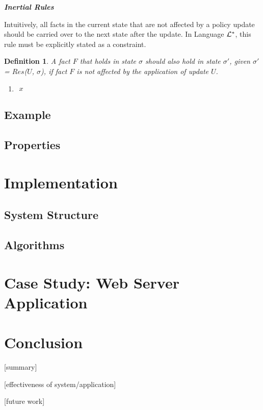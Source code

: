 \documentclass[10pt, twocolumn]{article}
\newtheorem{definition}{Definition}
\begin{document}
        \noindent \textbf{\emph{Inertial Rules}}

          Intuitively, all facts in the current state that are not affected by
          a policy update should be carried over to the next state after the
          update. In Language ${\cal L}^{*}$, this rule must be explicitly
          stated as a constraint.

          \begin{definition}
            A fact $F$ that holds in state $\sigma$ should also hold in state
            $\sigma'$, given $\sigma'$ = $Res$($U$, $\sigma$), if fact $F$ is
            not affected by the application of update $U$.

            \begin{enumerate}
              \item
                \begin{math} 
                  \begin{aligned}
                    x 
                  \end{aligned}
                \end{math}
            \end{enumerate}
          \end{definition}

    \subsection{Example}

    \subsection{Properties}

  \section{Implementation}

    \subsection{System Structure}

    \subsection{Algorithms}

  \section{Case Study: Web Server Application}

  \section{Conclusion}

    [summary]

    [effectiveness of system/application]

    [future work]
\end{document}
